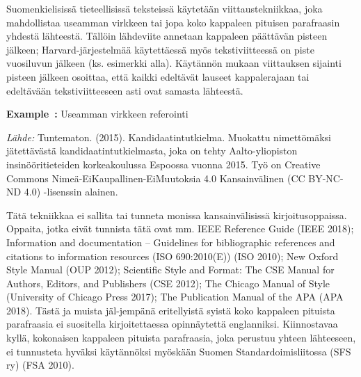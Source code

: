 \documentclass[finnish, 12pt, a4paper, arts, utf8, a-2b, online]{aaltothesis}
\begin{document}
Suomenkielisissä tieteellisissä teksteissä käytetään viittaustekniikkaa, joka 
mahdollistaa useamman virkkeen tai jopa koko kappaleen pituisen parafraasin 
yhdestä lähteestä. Tällöin lähdeviite annetaan kappaleen päättävän pisteen 
jälkeen; Harvard-järjestelmää käytettäessä myös tekstiviitteessä on piste 
vuosiluvun jälkeen (ks. esimerkki alla). Käytännön mukaan viittauksen sijainti 
pisteen jälkeen osoittaa, että kaikki edeltävät lauseet kappalerajaan tai 
edeltävään tekstiviitteeseen asti ovat samasta lähteestä.

\vspace{1em}
\noindent
{}
\textsf{\textbf{Example~\theexample:}} \label{ex:Finn} Useamman virkkeen 
referointi

\vspace{1ex}
\noindent
{}

\vspace{1ex}
\noindent
\textit{Lähde:} Tuntematon. (2015). Kandidaatintutkielma. Muokattu nimettömäksi 
jätettävästä kandidaatintutkielmasta, joka on tehty Aalto-yliopiston 
insinööritieteiden korkeakoulussa Espoossa vuonna 2015. Työ on Creative Commons 
Nimeä-EiKaupallinen-EiMuutoksia 4.0 Kansainvälinen (CC BY-NC-ND 4.0) -lisenssin 
alainen.

Tätä tekniikkaa ei sallita tai tunneta monissa kansainvälisissä 
kirjoitusoppaissa. Oppaita, jotka eivät tunnista tätä ovat mm. IEEE Reference 
Guide (IEEE 2018); Information and documentation – Guidelines for bibliographic 
references and citations to information resources (ISO 690:2010(E)) (ISO 2010); 
New Oxford Style Manual (OUP 2012); Scientific Style and Format: The CSE Manual 
for Authors, Editors, and Publishers (CSE 2012); The Chicago Manual of Style 
(University of Chicago Press 2017); The Publication Manual of the APA (APA 
2018). Tästä ja muista jäl-jempänä eritellyistä syistä koko kappaleen pituista 
parafraasia ei suositella kirjoitettaessa opinnäytettä englanniksi. Kiinnostavaa 
kyllä, kokonaisen kappaleen pituista parafraasia, joka perustuu yhteen 
lähteeseen, ei tunnusteta hyväksi käytännöksi myöskään Suomen 
Standardoimisliitossa (SFS ry) (FSA 2010).
\end{document}
